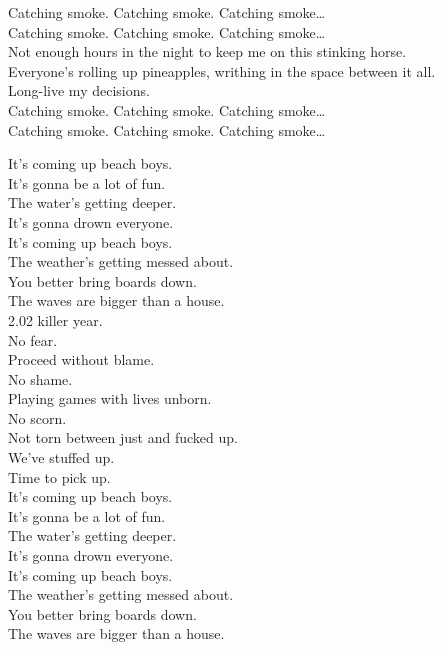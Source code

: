 Catching smoke. Catching smoke. Catching smoke… \\
Catching smoke. Catching smoke. Catching smoke… \\

Not enough hours in the night to keep me on this stinking horse. \\
Everyone's rolling up pineapples, writhing in the space between it all. \\
Long-live my decisions. \\

Catching smoke. Catching smoke. Catching smoke… \\
Catching smoke. Catching smoke. Catching smoke… \\




It's coming up beach boys. \\
It's gonna be a lot of fun. \\
The water's getting deeper. \\
It's gonna drown everyone. \\
It's coming up beach boys. \\
The weather's getting messed about. \\
You better bring boards down. \\
The waves are bigger than a house. \\

2.02 killer year. \\
No fear. \\
Proceed without blame. \\
No shame. \\
Playing games with lives unborn. \\
No scorn. \\
Not torn between just and fucked up. \\
We've stuffed up. \\
Time to pick up. \\

It's coming up beach boys. \\
It's gonna be a lot of fun. \\
The water's getting deeper. \\
It's gonna drown everyone. \\
It's coming up beach boys. \\
The weather's getting messed about. \\
You better bring boards down. \\
The waves are bigger than a house. \\

